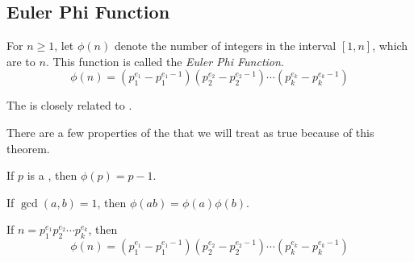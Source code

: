 \subsection{Euler Phi Function}\label{subsec:Euler_Phi_Function}
\begin{definition}\label{def:Euler_Phi_Function}
  For $n \geq 1$, let $\phi(n)$ denote the number of integers in the interval $[1, n]$, which are  to $n$.
  This function is called the \emph{Euler Phi Function}.
  \begin{equation}\label{eq:Euler_Phi_Function}
    \phi(n) = \left( p_{1}^{e_{1}} - p_{1}^{e_{1}-1} \right) \left( p_{2}^{e_{2}} - p_{2}^{e_{2}-1} \right) \cdots \left( p_{k}^{e_{k}} - p_{k}^{e_{k}-1} \right)
  \end{equation}
  \begin{remark}
    The  is closely related to .
  \end{remark}
\end{definition}

\begin{theorem}\label{thm:Euler_Phi_Function}
  There are a few properties of the  that we will treat as true because of this theorem.
  \begin{propertylist}
  \item If $p$ is a , then $\phi(p) = p - 1$.\label{prop:Euler_Phi_Function_Properties-Prime_Number}
  \item If $\gcd(a, b) = 1$, then $\phi(ab) = \phi(a) \phi(b)$.\label{prop:Euler_Phi_Function_Properties-Split_Multiplication}
  \item If $n = p_{1}^{e_{1}} p_{2}^{e_{2}} \cdots p_{k}^{e_{k}}$, then
    \begin{equation*}
      \phi(n) = \left( p_{1}^{e_{1}} - p_{1}^{e_{1}-1} \right) \left( p_{2}^{e_{2}} - p_{2}^{e_{2}-1} \right) \cdots \left( p_{k}^{e_{k}} - p_{k}^{e_{k}-1} \right)
    \end{equation*}\label{prop:Euler_Phi_Function_Properties-Product_of_Primes}
  \end{propertylist}
\end{theorem}

